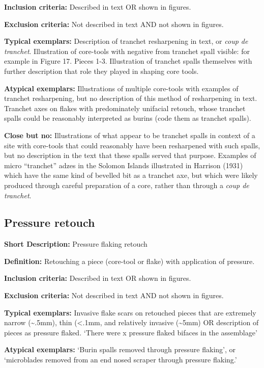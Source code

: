 \documentclass[
]{article}
\begin{document}
\textbf{Inclusion criteria:} Described in text OR shown in figures.

\textbf{Exclusion criteria:} Not described in text AND not shown in
figures.

\textbf{Typical exemplars:} Description of tranchet resharpening in
text, or \emph{coup de tranchet}. Illustration of core-tools with
negative from tranchet spall visible: for example in Figure 17. Pieces
1-3. Illustration of tranchet spalls themselves with further description
that role they played in shaping core tools.

\textbf{Atypical exemplars:} Illustrations of multiple core-tools with
examples of tranchet resharpening, but no description of this method of
resharpening in text. Tranchet axes on flakes with predominately
unifacial retouch, whose tranchet spalls could be reasonably interpreted
as burins (code them as tranchet spalls).

\textbf{Close but no:} Illustrations of what appear to be tranchet
spalls in context of a site with core-tools that could reasonably have
been resharpened with such spalls, but no description in the text that
these spalls served that purpose. Examples of micro ``tranchet'' adzes
in the Solomon Islands illustrated in Harrison (1931) which have the
same kind of bevelled bit as a tranchet axe, but which were likely
produced through careful preparation of a core, rather than through a
\emph{coup de tranchet}.

\subsection{Pressure retouch}\label{pressure-retouch}

\textbf{Short Description:} Pressure flaking retouch

\textbf{Definition:} Retouching a piece (core-tool or flake) with
application of pressure.

\textbf{Inclusion criteria:} Described in text OR shown in figures.

\textbf{Exclusion criteria:} Not described in text AND not shown in
figures.

\textbf{Typical exemplars:} Invasive flake scars on retouched pieces
that are extremely narrow (\textasciitilde.5mm), thin (\textless.1mm,
and relatively invasive (\textasciitilde5mm) OR description of pieces as
pressure flaked. `There were x pressure flaked bifaces in the
assemblage'

\textbf{Atypical exemplars:} `Burin spalls removed through pressure
flaking', or `microblades removed from an end nosed scraper through
pressure flaking.'
\end{document}
